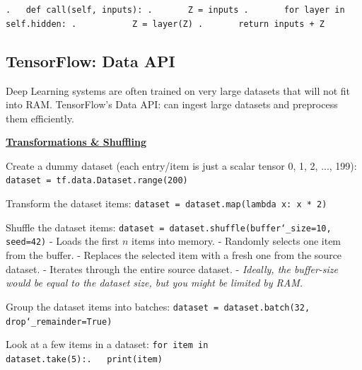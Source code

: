 \texttt{.~~~def call(self, inputs):\newline
.~~~~~~~Z = inputs\newline
.~~~~~~~for layer in self.hidden:\newline
.~~~~~~~~~~~Z = layer(Z)\newline
.~~~~~~~return inputs + Z}

\newpage
\subsection{TensorFlow: Data API}

Deep Learning systems are often trained on very large datasets that will not fit into RAM.\newline
TensorFlow's Data API: can ingest large datasets and preprocess them efficiently.

\textbf{\underline{Transformations \& Shuffling}}

Create a dummy dataset (each entry/item is just a scalar tensor 0, 1, 2, ..., 199):\newline
\texttt{dataset = tf.data.Dataset.range(200)}

Transform the dataset items:\newline
\texttt{dataset = dataset.map(lambda x:~x * 2)}

Shuffle the dataset items:\newline
\texttt{dataset = dataset.shuffle(buffer\char`_size=10, seed=42)}\newline
- Loads the first $n$ items into memory.\newline
- Randomly selects one item from the buffer.\newline
- Replaces the selected item with a fresh one from the source dataset.\newline
- Iterates through the entire source dataset.\newline
- \textit{Ideally, the buffer-size would be equal to the dataset size, but you might be limited by RAM.}

Group the dataset items into batches:\newline
\texttt{dataset = dataset.batch(32, drop\char`_remainder=True)}

Look at a few items in a dataset:\newline
\texttt{for item in dataset.take(5):\newline.~~~print(item)}\newline

